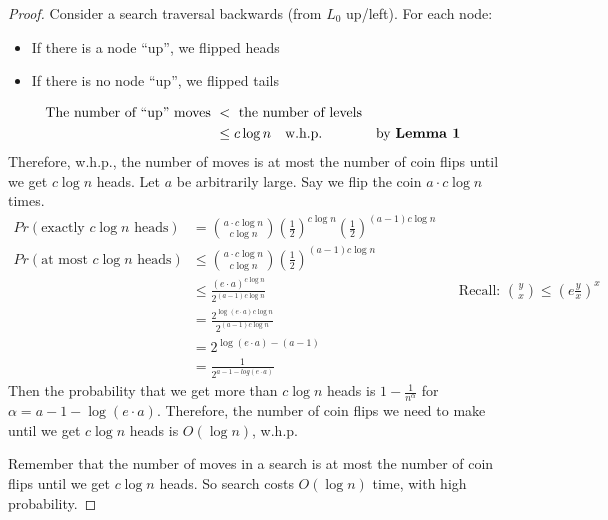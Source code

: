 \documentclass[11pt]{article}
\theoremstyle{plain}
\theoremstyle{definition}
\begin{document}
\begin{proof}
    Consider a search traversal backwards (from $L_0$ up/left). For each node: 
    \begin{itemize}
        \item If there is a node ``up'', we flipped heads
        \item If there is no node ``up'', we flipped tails 
    \end{itemize}
    \begin{align*}
        \text{The number of ``up'' moves } &< \text{ the number of levels}\\
                                           &\leq c \log n \quad\text{w.h.p.} && \text{by \textbf{Lemma 1}}
    \end{align*}
    Therefore, w.h.p., the number of moves is at most the number of coin flips until we get $c \log n$
    heads. Let $a$ be arbitrarily large. Say we flip the coin $a\cdot c \log n$ times.
    \begin{align*}
        Pr(\text{exactly $c \log n$ heads}) &= \binom{a \cdot c\log n}{c \log n} 
        \left(\frac{1}{2}\right)^{c\log n} \left(\frac{1}{2}\right)^{(a-1)c\log n}\\
        Pr(\text{at most $c \log n$ heads}) &\leq \binom{a \cdot c\log n}{c \log n} 
        \left(\frac{1}{2}\right)^{(a-1)c\log n}\\
                                            &\leq \frac{(e \cdot a)^{c\log n}}{2^{(a-1)c\log n}}
            && \text{Recall: } \displaystyle\binom{y}{x} \leq \left(e\displaystyle\frac{y}{x}\right)^x\\
            &= \frac{2^{\log (e \cdot a)c \log n}}{2^{(a-1)c\log n}}\\
            &= 2^{\log (e \cdot a) - (a - 1)}\\
            &= \frac{1}{2^{a-1-log(e \cdot a)}}
    \end{align*}
    Then the probability that we get more than $c \log n$ heads is $1 - \displaystyle\frac{1}{n^\alpha}$
    for $\alpha = a - 1 - \log(e \cdot a)$. Therefore, the number of coin flips we need to make until 
    we get $c \log n$ heads is $O(\log n)$, w.h.p.

    Remember that the number of moves in a search is at most the number of coin flips until we get 
    $c\log n$ heads. So search costs $O(\log n)$ time, with high probability.
\end{proof}
\end{document}
